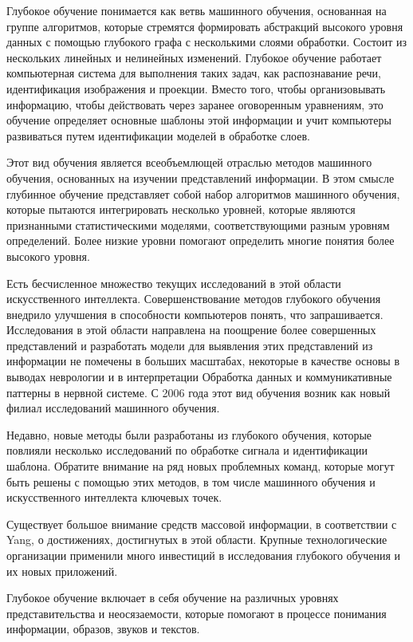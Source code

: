 Глубокое обучение понимается как ветвь машинного обучения, основанная на группе алгоритмов,
которые стремятся формировать абстракций высокого уровня
данных с помощью глубокого графа с несколькими слоями обработки.
Состоит из нескольких линейных и нелинейных изменений.
Глубокое обучение работает компьютерная система для выполнения таких задач,
как распознавание речи, идентификация изображения и проекции.
Вместо того, чтобы организовывать информацию, чтобы действовать через заранее оговоренным уравнениям,
это обучение определяет основные шаблоны этой информации и
учит компьютеры развиваться путем идентификации моделей в обработке слоев.

Этот вид обучения является всеобъемлющей отраслью методов машинного обучения,
основанных на изучении представлений информации.
В этом смысле глубинное обучение представляет собой набор алгоритмов машинного обучения,
которые пытаются интегрировать несколько уровней,
которые являются признанными статистическими моделями, соответствующими разным уровням определений.
Более низкие уровни помогают определить многие понятия более высокого уровня.

Есть бесчисленное множество текущих исследований в этой области искусственного интеллекта.
Совершенствование методов глубокого обучения внедрило улучшения в способности компьютеров понять, что запрашивается.
Исследования в этой области направлена на поощрение более совершенных представлений и
разработать модели для выявления этих представлений из информации не помечены в больших масштабах,
некоторые в качестве основы в выводах неврологии и в интерпретации Обработка данных и
коммуникативные паттерны в нервной системе.
С 2006 года этот вид обучения возник как новый филиал исследований машинного обучения.

Недавно, новые методы были разработаны из глубокого обучения,
которые повлияли несколько исследований по обработке сигнала и идентификации шаблона.
Обратите внимание на ряд новых проблемных команд, которые могут быть решены с помощью этих методов,
в том числе машинного обучения и искусственного интеллекта ключевых точек.

Существует большое внимание средств массовой информации,
в соответствии с Yang, о достижениях, достигнутых в этой области.
Крупные технологические организации применили много инвестиций
в исследования глубокого обучения и их новых приложений.

Глубокое обучение включает в себя обучение на различных уровнях представительства и неосязаемости,
которые помогают в процессе понимания информации, образов, звуков и текстов.


